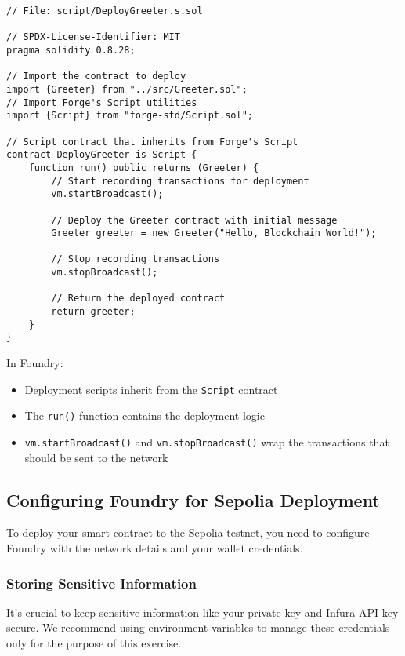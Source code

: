 \documentclass[12pt]{article}
\begin{document}
\noindent
\begin{minipage}[c]{\textwidth}
\begin{lstlisting}[language=Solidity]
// File: script/DeployGreeter.s.sol

// SPDX-License-Identifier: MIT
pragma solidity 0.8.28;

// Import the contract to deploy
import {Greeter} from "../src/Greeter.sol";
// Import Forge's Script utilities
import {Script} from "forge-std/Script.sol";

// Script contract that inherits from Forge's Script
contract DeployGreeter is Script {
    function run() public returns (Greeter) {
        // Start recording transactions for deployment
        vm.startBroadcast();
        
        // Deploy the Greeter contract with initial message
        Greeter greeter = new Greeter("Hello, Blockchain World!");
        
        // Stop recording transactions
        vm.stopBroadcast();
        
        // Return the deployed contract
        return greeter;
    }
}
\end{lstlisting}
\end{minipage}

In Foundry:
\begin{itemize}
    \item Deployment scripts inherit from the \texttt{Script} contract
    \item The \texttt{run()} function contains the deployment logic
    \item \texttt{vm.startBroadcast()} and \texttt{vm.stopBroadcast()} wrap the transactions that should be sent to the network
\end{itemize}

\subsection{Configuring Foundry for Sepolia Deployment}

To deploy your smart contract to the Sepolia testnet, you need to configure Foundry with the network details and your wallet credentials.

\subsubsection*{Storing Sensitive Information}

It’s crucial to keep sensitive information like your private key and Infura API key secure. We recommend using environment variables to manage these credentials only for the purpose of this exercise.
\end{document}
